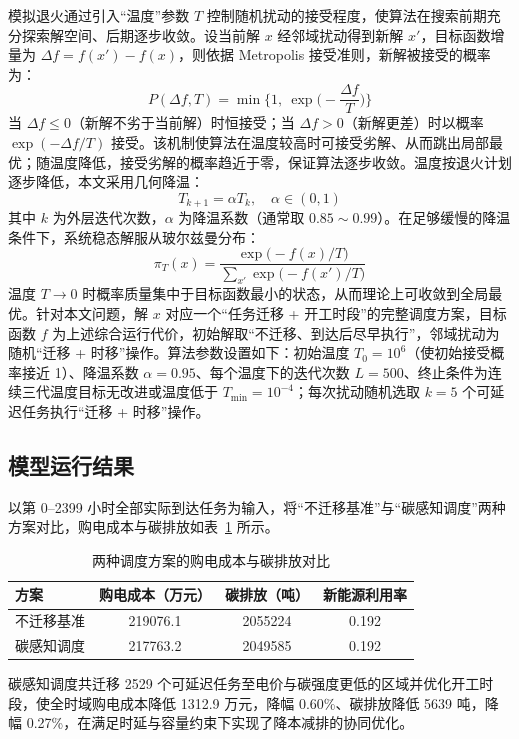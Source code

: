 \documentclass{ctexart}
\begin{document}
模拟退火通过引入“温度”参数 $T$ 控制随机扰动的接受程度，使算法在搜索前期充分探索解空间、后期逐步收敛。设当前解 $x$ 经邻域扰动得到新解 $x'$，目标函数增量为 $\Delta f=f(x')-f(x)$，则依据 Metropolis 接受准则\cite{metropolis1953}，新解被接受的概率为：
\[
P(\Delta f,T)=\min\Big\{1,\ \exp\Big(-\frac{\Delta f}{T}\Big)\Big\}
\]
当 $\Delta f\le 0$（新解不劣于当前解）时恒接受；当 $\Delta f>0$（新解更差）时以概率 $\exp(-\Delta f/T)$ 接受。该机制使算法在温度较高时可接受劣解、从而跳出局部最优；随温度降低，接受劣解的概率趋近于零，保证算法逐步收敛。温度按退火计划逐步降低，本文采用几何降温：
\[
T_{k+1}=\alpha T_k,\quad \alpha\in(0,1)
\]
其中 $k$ 为外层迭代次数，$\alpha$ 为降温系数（通常取 $0.85\sim0.99$）。在足够缓慢的降温条件下，系统稳态解服从玻尔兹曼分布：
\[
\pi_T(x)=\frac{\exp\big(-f(x)/T\big)}{\sum_{x'}\exp\big(-f(x')/T\big)}
\]
温度 $T\to0$ 时概率质量集中于目标函数最小的状态，从而理论上可收敛到全局最优\cite{kirkpatrick1983}。针对本文问题，解 $x$ 对应一个“任务迁移 + 开工时段”的完整调度方案，目标函数 $f$ 为上述综合运行代价，初始解取“不迁移、到达后尽早执行”，邻域扰动为随机“迁移 + 时移”操作。算法参数设置如下：初始温度 $T_0=10^6$（使初始接受概率接近 1）、降温系数 $\alpha=0.95$、每个温度下的迭代次数 $L=500$、终止条件为连续三代温度目标无改进或温度低于 $T_{\min}=10^{-4}$；每次扰动随机选取 $k=5$ 个可延迟任务执行“迁移 + 时移”操作。

\subsection{模型运行结果}

以第 0–2399 小时全部实际到达任务为输入，将“不迁移基准”与“碳感知调度”两种方案对比，购电成本与碳排放如表~\ref{tab:carbon} 所示。

\begin{table}[H]
	\centering
	\caption{两种调度方案的购电成本与碳排放对比}
	\label{tab:carbon}
	\begin{tabular}{lccc}
		\toprule
		方案 & 购电成本（万元） & 碳排放（吨） & 新能源利用率 \\
		\midrule
		不迁移基准 & 219076.1 & 2055224 & 0.192 \\
		碳感知调度 & 217763.2 & 2049585 & 0.192 \\
		\bottomrule
	\end{tabular}
\end{table}

碳感知调度共迁移 2529 个可延迟任务至电价与碳强度更低的区域并优化开工时段，使全时域购电成本降低 1312.9 万元，降幅 0.60\%、碳排放降低 5639 吨，降幅 0.27\%，在满足时延与容量约束下实现了降本减排的协同优化。
\end{document}

